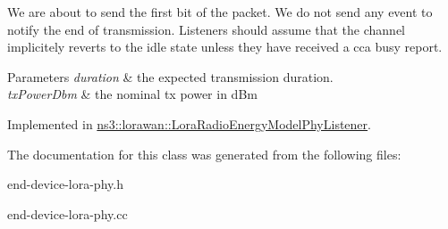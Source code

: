We are about to send the first bit of the packet. We do not send any event to notify the end of transmission. Listeners should assume that the channel implicitely reverts to the idle state unless they have received a cca busy report.


\begin{DoxyParams}{Parameters}
{\em duration} & the expected transmission duration. \\
\hline
{\em tx\+Power\+Dbm} & the nominal tx power in d\+Bm \\
\hline
\end{DoxyParams}


Implemented in \hyperlink{classns3_1_1lorawan_1_1LoraRadioEnergyModelPhyListener_a42d031fca675ad2a5b76977a7d79e900}{ns3\+::lorawan\+::\+Lora\+Radio\+Energy\+Model\+Phy\+Listener}.



The documentation for this class was generated from the following files\+:\begin{DoxyCompactItemize}
\item 
end-\/device-\/lora-\/phy.\+h\item 
end-\/device-\/lora-\/phy.\+cc\end{DoxyCompactItemize}
